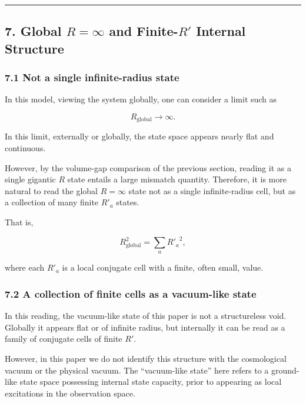 \documentclass[
]{article}
\begin{document}
\begin{center}\rule{0.5\linewidth}{0.5pt}\end{center}

\subsection{\texorpdfstring{7. Global \(R=\infty\) and Finite-\(R'\)
Internal
Structure}{7. Global R=\textbackslash infty and Finite-R\textquotesingle{} Internal Structure}}\label{global-rinfty-and-finite-r-internal-structure}

\subsubsection{7.1 Not a single infinite-radius
state}\label{not-a-single-infinite-radius-state}

In this model, viewing the system globally, one can consider a limit
such as

\[
R_{\mathrm{global}}\to\infty.
\]

In this limit, externally or globally, the state space appears nearly
flat and continuous.

However, by the volume-gap comparison of the previous section, reading
it as a single gigantic \(R\) state entails a large mismatch quantity.
Therefore, it is more natural to read the global \(R=\infty\) state not
as a single infinite-radius cell, but as a collection of many finite
\(R'_a\) states.

That is,

\[
R_{\mathrm{global}}^2=\sum_a {R'_a}^2,
\]

where each \(R'_a\) is a local conjugate cell with a finite, often
small, value.

\subsubsection{7.2 A collection of finite cells as a vacuum-like
state}\label{a-collection-of-finite-cells-as-a-vacuum-like-state}

In this reading, the vacuum-like state of this paper is not a
structureless void. Globally it appears flat or of infinite radius, but
internally it can be read as a family of conjugate cells of finite
\(R'\).

However, in this paper we do not identify this structure with the
cosmological vacuum or the physical vacuum. The ``vacuum-like state''
here refers to a ground-like state space possessing internal state
capacity, prior to appearing as local excitations in the observation
space.
\end{document}
